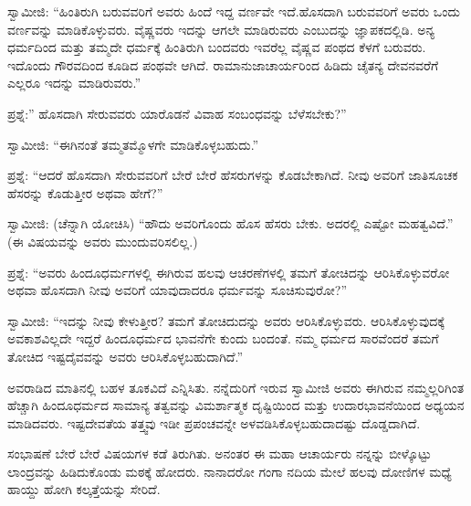 ಸ್ವಾಮೀಜಿ: “ಹಿಂತಿರುಗಿ ಬರುವವರಿಗೆ ಅವರು ಹಿಂದೆ ಇದ್ದ ವರ್ಣವೇ ಇದೆ.ಹೊಸದಾಗಿ ಬರುವವರಿಗೆ ಅವರು ಒಂದು ವರ್ಣವನ್ನು ಮಾಡಿಕೊಳ್ಳುವರು. ವೈಷ್ಣವರು ಇದನ್ನು ಆಗಲೇ ಮಾಡಿರುವರು ಎಂಬುದನ್ನು ಜ್ಞಾಪಕದಲ್ಲಿಡಿ. ಅನ್ಯ ಧರ್ಮದಿಂದ ಮತ್ತು ತಮ್ಮದೇ ಧರ್ಮಕ್ಕೆ ಹಿಂತಿರುಗಿ ಬಂದವರು ಇವರೆಲ್ಲ ವೈಷ್ಣವ ಪಂಥದ ಕೆಳಗೆ ಬರುವರು. ಇದೊಂದು ಗೌರವದಿಂದ ಕೂಡಿದ ಪಂಥವೇ ಆಗಿದೆ. ರಾಮಾನುಜಾಚಾರ್ಯರಿಂದ ಹಿಡಿದು ಚೈತನ್ಯ ದೇವನವರೆಗೆ ಎಲ್ಲರೂ ಇದನ್ನು ಮಾಡಿರುವರು.”

ಪ್ರಶ್ನೆ:” ಹೊಸದಾಗಿ ಸೇರುವವರು ಯಾರೊಡನೆ ವಿವಾಹ ಸಂಬಂಧವನ್ನು ಬೆಳೆಸಬೇಕು?”

ಸ್ವಾಮೀಜಿ: “ಈಗಿನಂತೆ ತಮ್ಮತಮ್ಮೊಳಗೇ ಮಾಡಿಕೊಳ್ಳಬಹುದು.”

ಪ್ರಶ್ನೆ: “ಆದರೆ ಹೊಸದಾಗಿ ಸೇರುವವರಿಗೆ ಬೇರೆ ಬೇರೆ ಹೆಸರುಗಳನ್ನು ಕೊಡಬೇಕಾಗಿದೆ. ನೀವು ಅವರಿಗೆ ಜಾತಿಸೂಚಕ ಹೆಸರನ್ನು ಕೊಡುತ್ತೀರ ಅಥವಾ ಹೇಗೆ?”

ಸ್ವಾಮೀಜಿ: (ಚೆನ್ನಾಗಿ ಯೋಚಿಸಿ) “ಹೌದು ಅವರಿಗೊಂದು ಹೊಸ ಹೆಸರು ಬೇಕು. ಅದರಲ್ಲಿ ಎಷ್ಟೋ ಮಹತ್ವವಿದೆ.” (ಈ ವಿಷಯವನ್ನು ಅವರು ಮುಂದುವರಿಸಲಿಲ್ಲ.)

ಪ್ರಶ್ನೆ: “ಅವರು ಹಿಂದೂಧರ್ಮಗಳಲ್ಲಿ ಈಗಿರುವ ಹಲವು ಆಚರಣೆಗಳಲ್ಲಿ ತಮಗೆ ತೋಚಿದನ್ನು ಆರಿಸಿಕೊಳ್ಳುವರೋ ಅಥವಾ ಹೊಸದಾಗಿ ನೀವು ಅವರಿಗೆ ಯಾವುದಾದರೂ ಧರ್ಮವನ್ನು ಸೂಚಿಸುವುರೋ?”

ಸ್ವಾಮೀಜಿ: “ಇದನ್ನು ನೀವು ಕೇಳುತ್ತೀರ? ತಮಗೆ ತೋಚಿದುದನ್ನು ಅವರು ಆರಿಸಿಕೊಳ್ಳುವರು. ಆರಿಸಿಕೊಳ್ಳುವುದಕ್ಕೆ ಅವಕಾಶವಿಲ್ಲದೇ ಇದ್ದರೆ ಹಿಂದೂಧರ್ಮದ ಭಾವನೆಗೇ ಕುಂದು ಬಂದಂತೆ. ನಮ್ಮ ಧರ್ಮದ ಸಾರವೆಂದರೆ ತಮಗೆ ತೋಚಿದ ಇಷ್ಟದೈವವನ್ನು ಅವರು ಆರಿಸಿಕೊಳ್ಳಬಹುದಾಗಿದೆ.”

ಅವರಾಡಿದ ಮಾತಿನಲ್ಲಿ ಬಹಳ ತೂಕವಿದೆ ಎನ್ನಿಸಿತು. ನನ್ನೆದುರಿಗೆ ಇರುವ ಸ್ವಾಮೀಜಿ ಅವರು ಈಗಿರುವ ನಮ್ಮಲ್ಲರಿಗಿಂತ ಹೆಚ್ಚಾಗಿ ಹಿಂದೂಧರ್ಮದ ಸಾಮಾನ್ಯ ತತ್ವವನ್ನು ವಿಮರ್ಶಾತ್ಮಕ ದೃಷ್ಟಿಯಿಂದ ಮತ್ತು ಉದಾರಭಾವನೆಯಿಂದ ಅಧ್ಯಯನ ಮಾಡಿದವರು. ಇಷ್ಟದೇವತೆಯ ತತ್ತ್ವವು ಇಡೀ ಪ್ರಪಂಚವನ್ನೇ ಅಳವಡಿಸಿಕೊಳ್ಳಬಹುದಾದಷ್ಟು ದೊಡ್ಡದಾಗಿದೆ.

ಸಂಭಾಷಣೆ ಬೇರೆ ಬೇರೆ ವಿಷಯಗಳ ಕಡೆ ತಿರುಗಿತು. ಅನಂತರ ಈ ಮಹಾ ಆಚಾರ್ಯರು ನನ್ನನ್ನು ಬೀಳ್ಕೊಟ್ಟು ಲಾಂದ್ರವನ್ನು ಹಿಡಿದುಕೊಂಡು ಮಠಕ್ಕೆ ಹೋದರು. ನಾನಾದರೋ ಗಂಗಾ ನದಿಯ ಮೇಲೆ ಹಲವು ದೋಣಿಗಳ ಮಧ್ಯೆ ಹಾಯ್ದು ಹೋಗಿ ಕಲ್ಕತ್ತೆಯನ್ನು ಸೇರಿದೆ.

